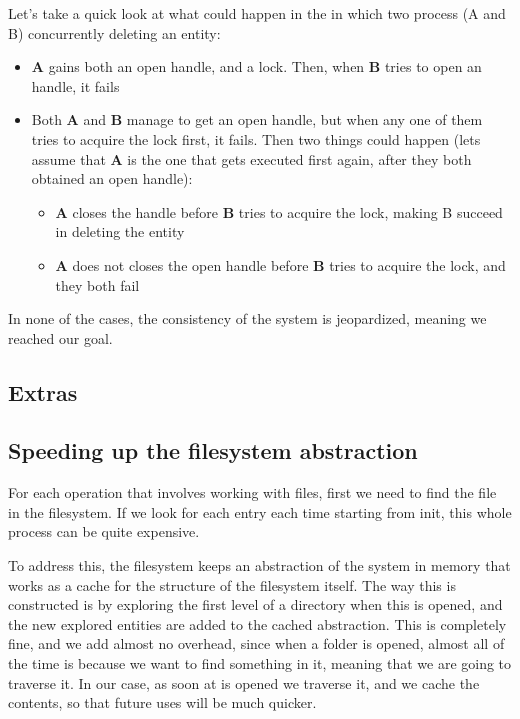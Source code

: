 \documentclass[a4paper,twoside,openright]{report}
\begin{document}
Let's take a quick look at what could happen in the in which two process (A and B) concurrently deleting an entity:
\begin{itemize}
    \item \textbf{A} gains both an open handle, and a lock. Then, when \textbf{B} tries to open an handle, it fails
    \item Both \textbf{A} and \textbf{B} manage to get an open handle, but when any one of them tries to acquire the lock first, it fails. Then two things could happen (lets assume that \textbf{A} is the one that gets executed first again, after they both obtained an open handle):
        \begin{itemize}
            \item \textbf{A} closes the handle before \textbf{B} tries to acquire the lock, making B succeed in deleting the entity
            \item \textbf{A} does not closes the open handle before \textbf{B} tries to acquire the lock, and they both fail
        \end{itemize}
\end{itemize}

In none of the cases, the consistency of the system is jeopardized, meaning we reached our goal.

\subsection*{Extras}

\subsection{Speeding up the filesystem abstraction}
\label{sub:speed_up_fs_cache}
For each operation that involves working with files, first we need to find the file in the filesystem.
If we look for each entry each time starting from init, this whole process can be quite expensive.

To address this, the filesystem keeps an abstraction of the system in memory that works as a cache for the structure of the filesystem itself.
The way this is constructed is by exploring the first level of a directory when this is opened, and the new explored entities are added to the cached abstraction.
This is completely fine, and we add almost no overhead, since when a folder is opened, almost all of the time is because we want to find something in it, meaning that we are going to traverse it. 
In our case, as soon at is opened we traverse it, and we cache the contents, so that future uses will be much quicker.
\end{document}
